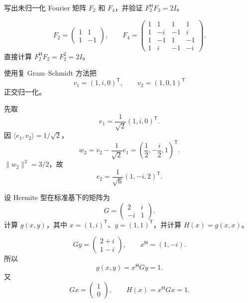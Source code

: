 \begin{exercise}[level=basic]
写出未归一化 Fourier 矩阵 $F_2$ 和 $F_4$，并验证 $F_2^{\mathsf H}F_2=2I$。
\begin{solution}
\[
F_2=\begin{pmatrix}1&1\\1&-1\end{pmatrix},
\qquad
F_4=\begin{pmatrix}
1&1&1&1\\1&-i&-1&i\\1&-1&1&-1\\1&i&-1&-i
\end{pmatrix}.
\]
直接计算 $F_2^{\mathsf H}F_2=F_2^2=2I$。
\end{solution}
\end{exercise}

\begin{exercise}[level=standard]
使用复 Gram--Schmidt 方法把
\[
v_1=(1,i,0)^{\mathsf T},\qquad
v_2=(1,0,1)^{\mathsf T}
\]
正交归一化。
\begin{solution}
先取
\[
e_1=\frac1{\sqrt2}(1,i,0)^{\mathsf T}.
\]
因 $\langle e_1,v_2\rangle=1/\sqrt2$，
\[
w_2=v_2-\frac1{\sqrt2}e_1
=\left(\frac12,-\frac i2,1\right)^{\mathsf T}.
\]
$\lVert w_2\rVert^2=3/2$，故
\[
e_2=\frac1{\sqrt6}(1,-i,2)^{\mathsf T}.
\]
\end{solution}
\end{exercise}

\begin{exercise}[level=standard]
设 Hermite 型在标准基下的矩阵为
\[
G=\begin{pmatrix}2&i\\-i&1\end{pmatrix}.
\]
计算 $g(x,y)$，其中
$x=(1,i)^{\mathsf T}$、$y=(1,1)^{\mathsf T}$，并计算 $H(x)=g(x,x)$。
\begin{solution}
\[
Gy=\begin{pmatrix}2+i\\1-i\end{pmatrix},
\qquad
x^{\mathsf H}=(1,-i).
\]
所以
\[
g(x,y)=x^{\mathsf H}Gy=1.
\]
又
\[
Gx=\begin{pmatrix}1\\0\end{pmatrix},
\qquad H(x)=x^{\mathsf H}Gx=1.
\]
\end{solution}
\end{exercise}


